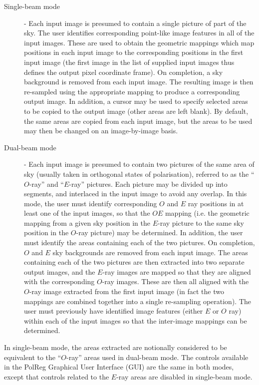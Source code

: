 \begin {description}

\item [Single-beam mode] - Each input image is presumed to contain a
single picture of part of the sky. The user identifies corresponding
point-like image features in all of the input images. These are used to
obtain the geometric mappings which map positions in each input image to
the corresponding positions in the first input image (the first image in
the list of supplied input images thus defines the output pixel
coordinate frame). On completion, a sky background is removed from each input 
image. The resulting image is then re-sampled using the
appropriate mapping to produce a corresponding output image. In addition,
a cursor may be used to specify selected areas to be copied to the
output image (other areas are left blank). By default, the same areas are
copied from each input image, but the areas to be used may then be
changed on an image-by-image basis.

\item [Dual-beam mode] - Each input image is presumed to contain two
pictures of the same area of sky (usually taken in orthogonal states of
polarisation), referred to as the ``$O$-ray'' and ``$E$-ray'' pictures.
Each picture may be divided up into segments, and interlaced in the input
image to avoid any overlap. In this mode, the user must identify
corresponding $O$ and $E$ ray positions in at least one of the input
images, so that the $OE$ mapping (i.e. the geometric mapping from a given
sky position in the $E$-ray picture to the same sky position in the
$O$-ray picture) may be determined. In addition, the user must identify
the areas containing each of the two pictures.  On completion, $O$ and $E$
sky backgrounds are removed from each input image. The areas containing
each of the two pictures are then extracted into two separate output images,
and the $E$-ray images are mapped so that they are aligned with the
corresponding $O$-ray images. These are then all aligned with the $O$-ray
image extracted from the first input image (in fact the two mappings are
combined together into a single re-sampling operation). The user must
previously have identified image features (either $E$ or $O$ ray) within
each of the input images so that the inter-image mappings can be
determined.

\end {description}

In single-beam mode, the areas extracted are notionally considered to be 
equivalent to the ``$O$-ray'' areas used in dual-beam mode. The controls
available in the PolReg Graphical User Interface (GUI) are the same
in both modes, except that controls related to the $E$-ray areas are
disabled in single-beam mode.

